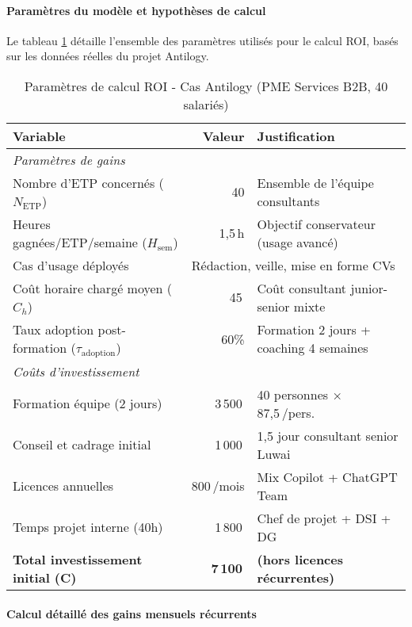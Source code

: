\paragraph{Paramètres du modèle et hypothèses de calcul}

Le tableau \ref{tab:roi_parameters} détaille l'ensemble des paramètres utilisés pour le calcul ROI, basés sur les données réelles du projet Antilogy.

\begin{table}[ht]
\centering
\caption{Paramètres de calcul ROI - Cas Antilogy (PME Services B2B, 40 salariés)}
\label{tab:roi_parameters}
\begin{tabular}{@{}lrl@{}}
\toprule
\textbf{Variable} & \textbf{Valeur} & \textbf{Justification} \\
\midrule
\multicolumn{3}{l}{\textit{Paramètres de gains}} \\
Nombre d'ETP concernés ($N_{\text{ETP}}$) & 40 & Ensemble de l'équipe consultants \\
Heures gagnées/ETP/semaine ($H_{\text{sem}}$) & 1{,}5\,h & Objectif conservateur (usage avancé) \\
Cas d'usage déployés & \multicolumn{2}{l}{Rédaction, veille, mise en forme CVs} \\
Coût horaire chargé moyen ($C_h$) & 45\,\texteuro{} & Coût consultant junior-senior mixte \\
Taux adoption post-formation ($\tau_{\text{adoption}}$) & 60\% & Formation 2 jours + coaching 4 semaines \\
\midrule
\multicolumn{3}{l}{\textit{Coûts d'investissement}} \\
Formation équipe (2 jours) & 3\,500\,\texteuro{} & 40 personnes × 87{,}5\,\texteuro{}/pers. \\
Conseil et cadrage initial & 1\,000\,\texteuro{} & 1{,}5 jour consultant senior Luwai \\
Licences annuelles & 800\,\texteuro{}/mois & Mix Copilot + ChatGPT Team \\
Temps projet interne (40h) & 1\,800\,\texteuro{} & Chef de projet + DSI + DG \\
\midrule
\textbf{Total investissement initial (C)} & \textbf{7\,100\,\texteuro{}} & \textbf{(hors licences récurrentes)} \\
\bottomrule
\end{tabular}
\end{table}

\paragraph{Calcul détaillé des gains mensuels récurrents}


